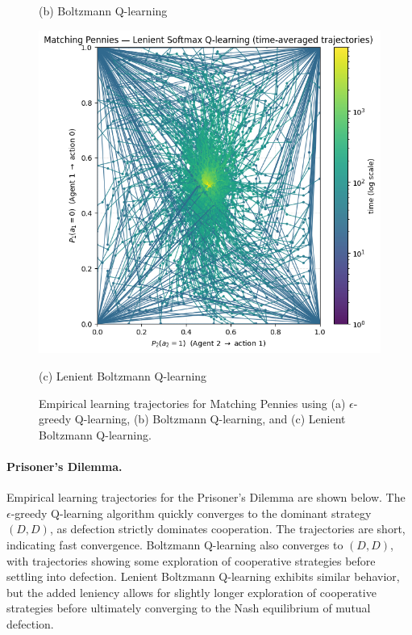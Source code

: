 \begin{figure}[h]
\begin{minipage}{0.32\textwidth}
        \caption*{(b) Boltzmann Q-learning}
    \end{minipage}
    \hfill
    \begin{minipage}{0.32\textwidth}
        \centering
        \includegraphics[width=\linewidth]{figures/task-2/learning/mp_lenient.png}
        \caption*{(c) Lenient Boltzmann Q-learning}
    \end{minipage}
    \caption{Empirical learning trajectories for Matching Pennies using (a) $\epsilon$-greedy Q-learning, (b) Boltzmann Q-learning, and (c) Lenient Boltzmann Q-learning.}
\end{figure}


\paragraph{Prisoner’s Dilemma.}
Empirical learning trajectories for the Prisoner’s Dilemma are shown below. The $\epsilon$-greedy Q-learning algorithm quickly converges to the dominant strategy $(D,D)$, as defection strictly dominates cooperation. The trajectories are short, indicating fast convergence. Boltzmann Q-learning also converges to $(D,D)$, with trajectories showing some exploration of cooperative strategies before settling into defection. Lenient Boltzmann Q-learning exhibits similar behavior, but the added leniency allows for slightly longer exploration of cooperative strategies before ultimately converging to the Nash equilibrium of mutual defection.             


